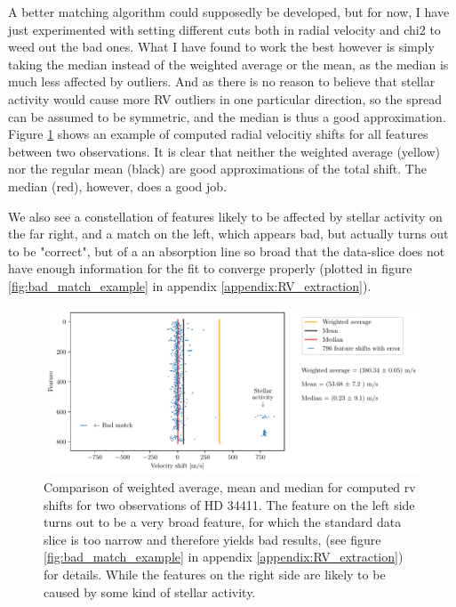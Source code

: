     A better matching algorithm could supposedly be developed, but for now, I have just experimented with setting different cuts both in radial velocity and chi2 to weed out the bad ones. What I have found to work the best however is simply taking the median instead of the weighted average or the mean, as the median is much less affected by outliers. And as there is no reason to believe that stellar activity would cause more RV outliers in one particular direction, so the spread can be assumed to be symmetric, and the median is thus a good approximation. Figure \ref{fig:median-mean-weighted-average} shows an example of computed radial velocitiy shifts for all features between two observations. It is clear that neither the weighted average (yellow) nor the regular mean (black) are good approximations of the total shift. The median (red), however, does a good job. 
    
    We also see a constellation of features likely to be affected by stellar activity on the far right, and a match on the left, which appears bad, but actually turns out to be "correct", but of a an absorption line so broad that the data-slice does not have enough information for the fit to converge properly (plotted in figure \ref{fig:bad_match_example} in appendix \ref{appendix:RV_extraction}).

    \begin{figure}%
        \begin{wide}  
            \includegraphics[width=\textwidth]{figures/median-mean-weighted.pdf}
            \caption{Comparison of weighted average, mean and median for computed rv shifts for two observations of HD 34411. The feature on the left side turns out to be a very broad feature, for which the standard data slice is too narrow and therefore yields bad results, (see figure \ref{fig:bad_match_example} in appendix \ref{appendix:RV_extraction}) for details. While the features on the right side are likely to be caused by some kind of stellar activity.}
        \label{fig:median-mean-weighted-average}
        \end{wide}
    \end{figure}

